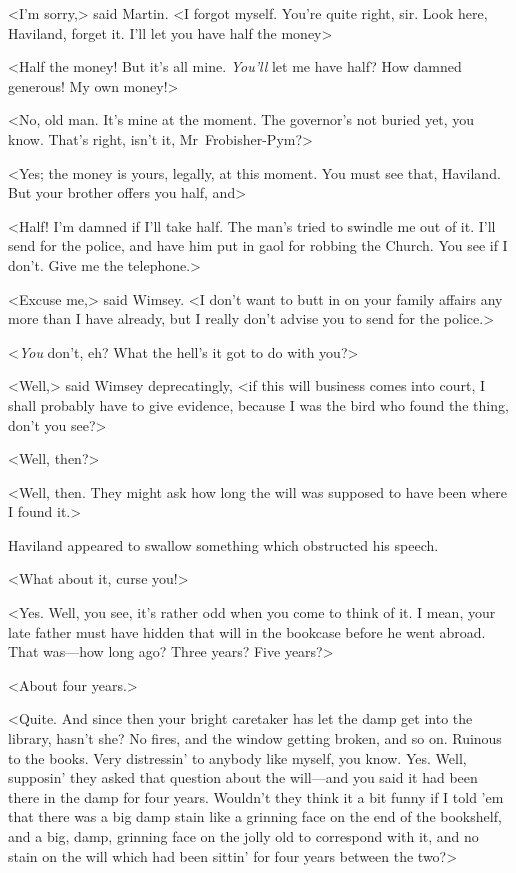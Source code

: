 <I'm sorry,> said Martin. <I forgot myself. You're quite right, sir. Look here, Haviland, forget it. I'll let you have half the money\longdash>

<Half the money! But it's all mine. \emph{You'll} let me have half? How damned generous! My own money!>

<No, old man. It's mine at the moment. The governor's not buried yet, you know. That's right, isn't it, Mr~Frobisher-Pym?>

<Yes; the money is yours, legally, at this moment. You must see that, Haviland. But your brother offers you half, and\longdash>

<Half! I'm damned if I'll take half. The man's tried to swindle me out of it. I'll send for the police, and have him put in gaol for robbing the Church. You see if I don't. Give me the telephone.>

<Excuse me,> said Wimsey. <I don't want to butt in on your family affairs any more than I have already, but I really don't advise you to send for the police.>

<\emph{You} don't, eh? What the hell's it got to do with you?>

<Well,> said Wimsey deprecatingly, <if this will business comes into court, I shall probably have to give evidence, because I was the bird who found the thing, don't you see?>

<Well, then?>

<Well, then. They might ask how long the will was supposed to have been where I found it.>

Haviland appeared to swallow something which obstructed his speech.

<What about it, curse you!>

<Yes. Well, you see, it's rather odd when you come to think of it. I mean, your late father must have hidden that will in the bookcase before he went abroad. That was—how long ago? Three years? Five years?>

<About four years.>

<Quite. And since then your bright caretaker has let the damp get into the library, hasn't she? No fires, and the window getting broken, and so on. Ruinous to the books. Very distressin' to anybody like myself, you know. Yes. Well, supposin' they asked that question about the will—and you said it had been there in the damp for four years. Wouldn't they think it a bit funny if I told 'em that there was a big damp stain like a grinning face on the end of the bookshelf, and a big, damp, grinning face on the jolly old  to correspond with it, and no stain on the will which had been sittin' for four years between the two?>

